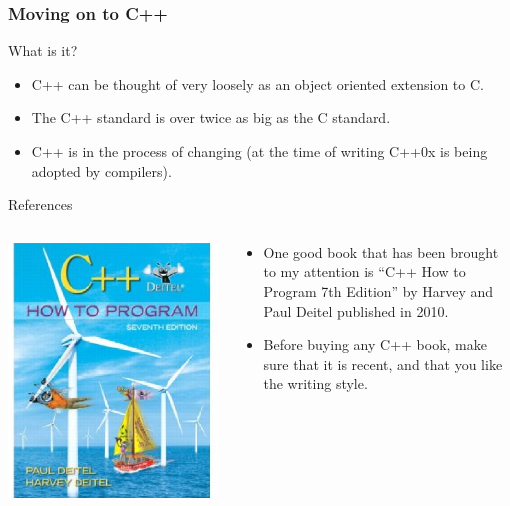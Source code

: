 \documentclass[table]{beamer}
\begin{document}
\begin{frame}
\frametitle{Moving on to C++}
\begin{block}{What is it?}
\begin{itemize}
\item C++ can be thought of very loosely as an object oriented extension to C.
\item The C++ standard is over twice as big as the C standard.
\item C++ is in the process of changing (at the time of writing C++0x is being adopted by compilers).
\end{itemize}
\end{block}
\begin{exampleblock}{References}
\begin{columns}
\begin{column}{1cm}
\includegraphics[width=2.6\textwidth]{deitelnew.eps}
\end{column}
\begin{column}{8cm}
\begin{itemize}
\item One good book that has been brought to my attention is ``C++ How to Program 7th Edition'' by Harvey and Paul Deitel published in 2010.
\item Before buying any C++ book, make sure that it is recent, and that you like the writing style.
\end{itemize}
\end{column}
\end{columns}
\end{exampleblock}
\end{frame}
\end{document}
